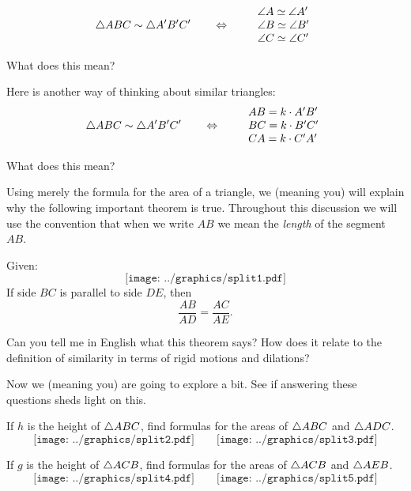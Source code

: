 \[
\triangle ABC \sim \triangle A'B'C' \qquad\Leftrightarrow \qquad\begin{array}{l}
\angle A \simeq \angle A'\\
\angle B \simeq \angle B' \\
\angle C \simeq \angle C'
\end{array}
\]

\begin{question} 
What does this mean?  
\end{question}
\QM

Here is another way of thinking about similar triangles:  
\[
\triangle ABC \sim \triangle A'B'C' \qquad\Leftrightarrow \qquad
\begin{array}{l}
AB = k\cdot A'B'\\
BC = k\cdot B'C' \\
CA = k\cdot C'A'
\end{array}
\]

\begin{question} 
What does this mean?  
\end{question}
\QM


Using merely the formula for the area of a triangle, we (meaning you)
will explain why the following important theorem is true. Throughout this 
discussion we will use the convention that when we
write $AB$ we mean the \textit{length} of the segment $AB$.


\begin{theorem} 
Given:
\[
\texttt{[image: ../graphics/split1.pdf]}
\]
If side $BC$ is parallel to side $DE$, then
\[
\frac{AB}{AD} = \frac{AC}{AE}.
\] 
\end{theorem}

\begin{question}
Can you tell me in English what this theorem says?  How does it relate to the definition of similarity in terms of rigid motions and dilations?  
\end{question}
\QM

Now we (meaning you) are going to explore a bit. See if answering
these questions sheds light on this.

\begin{question} 
If $h$ is the height of $\triangle ABC$, find formulas for the areas of
$\triangle ABC$ and $\triangle ADC$.
\[
\texttt{[image: ../graphics/split2.pdf]} \qquad \texttt{[image: ../graphics/split3.pdf]}
\]
\end{question}
\QM

\begin{question} 
If $g$ is the height of $\triangle ACB$, find formulas for the areas of
$\triangle ACB$ and $\triangle AEB$.
\[
\texttt{[image: ../graphics/split4.pdf]} \qquad \texttt{[image: ../graphics/split5.pdf]}
\]
\end{question}
\QM


